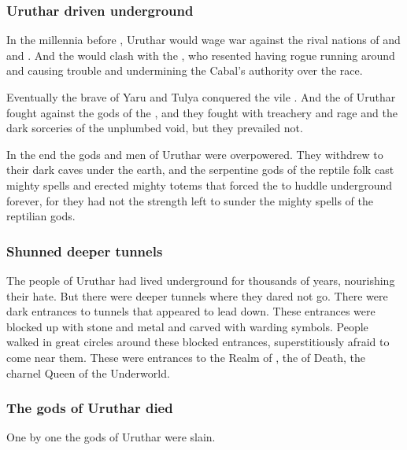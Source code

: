 \subsubsection{Uruthar driven underground}
In the millennia before , Uruthar would wage war against the rival nations of  and  and . 
And the \resphain would clash with the , who resented having rogue \resphain running around and causing trouble and undermining the Cabal's authority over the \resphan race. 

Eventually the brave \scathae of Yaru and Tulya conquered the vile \humans. 
And the \resphain of Uruthar fought against the \draconian gods of the \scathae, and they fought with treachery and rage and the dark sorceries of the unplumbed void, but they prevailed not.

In the end the gods and men of Uruthar were overpowered. 
They withdrew to their dark caves under the earth, and the serpentine gods of the reptile folk cast mighty spells and erected mighty totems that forced the \resphain to huddle underground forever, for they had not the strength left to sunder the mighty spells of the reptilian gods.





\subsubsection{Shunned deeper tunnels}
The people of Uruthar had lived underground for thousands of years, nourishing their hate. 
But there were deeper tunnels where they dared not go. 
There were dark entrances to tunnels that appeared to lead down.
These entrances were blocked up with stone and metal and carved with warding symbols.
People walked in great circles around these blocked entrances, superstitiously afraid to come near them. 
These were entrances to the Realm of , the \Dragon of Death, the charnel Queen of the Underworld.





\subsubsection{The gods of Uruthar died}
One by one the gods of Uruthar were slain.

